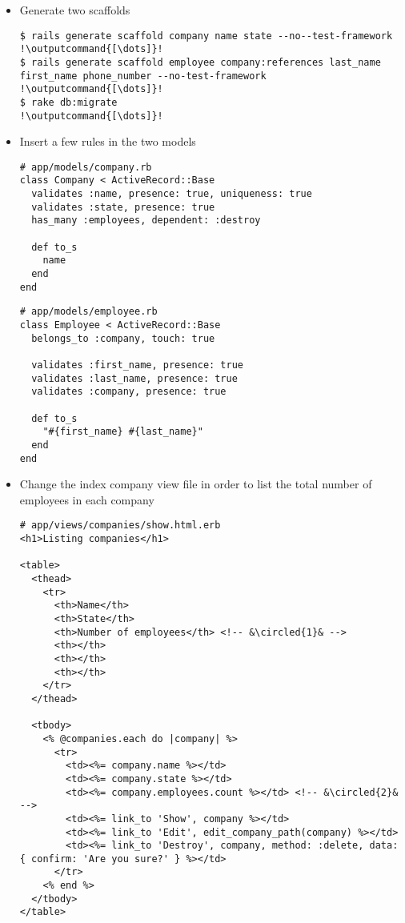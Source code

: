 \documentclass{beamer}
\newcommand*\circled[1]{\tikz[baseline=(char.base)]{
            \node[shape=circle,draw,inner sep=2pt] (char) {#1};}}
\newcommand{\outputcommand}[1]{\color{darkgreen}{#1}}
\begin{document}
\begin{frame}
\begin{itemize}
\item Generate two scaffolds
\lstset{language=shell}
\begin{lstlisting}[escapechar=!]
$ rails generate scaffold company name state --no--test-framework
!\outputcommand{[\dots]}!
$ rails generate scaffold employee company:references last_name first_name phone_number --no-test-framework
!\outputcommand{[\dots]}!
$ rake db:migrate
!\outputcommand{[\dots]}!
\end{lstlisting}

\item Insert a few rules in the two models
\lstset{language=Ruby, style=eclipse}
\begin{lstlisting}
# app/models/company.rb
class Company < ActiveRecord::Base
  validates :name, presence: true, uniqueness: true
  validates :state, presence: true
  has_many :employees, dependent: :destroy

  def to_s
    name
  end
end
\end{lstlisting}

\lstset{language=Ruby, style=eclipse}
\begin{lstlisting}
# app/models/employee.rb
class Employee < ActiveRecord::Base
  belongs_to :company, touch: true

  validates :first_name, presence: true
  validates :last_name, presence: true
  validates :company, presence: true

  def to_s
    "#{first_name} #{last_name}"
  end
end
\end{lstlisting}
 
\item Change the index company view file in order to list the total number of employees in each company
\lstset{language=Ruby, style=eclipse}
\begin{lstlisting}[escapechar=&]
# app/views/companies/show.html.erb
<h1>Listing companies</h1>

<table>
  <thead>
    <tr>
      <th>Name</th>
      <th>State</th>
      <th>Number of employees</th> <!-- &\circled{1}& -->
      <th></th>
      <th></th>
      <th></th>
    </tr>
  </thead>

  <tbody>
    <% @companies.each do |company| %>
      <tr>
        <td><%= company.name %></td>
        <td><%= company.state %></td>
        <td><%= company.employees.count %></td> <!-- &\circled{2}& -->
        <td><%= link_to 'Show', company %></td>
        <td><%= link_to 'Edit', edit_company_path(company) %></td>
        <td><%= link_to 'Destroy', company, method: :delete, data: { confirm: 'Are you sure?' } %></td>
      </tr>
    <% end %>
  </tbody>
</table>


\end{lstlisting}
\end{itemize}
\end{frame}
\end{document}
